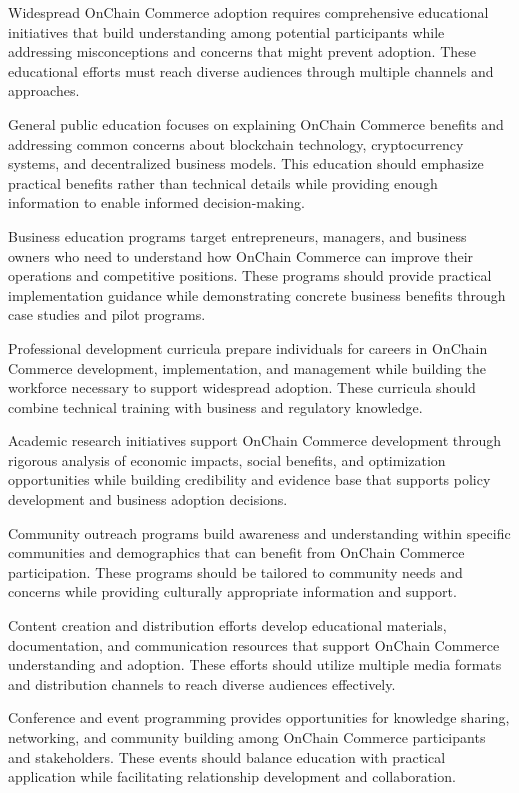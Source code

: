 \documentclass[
  Letterpaper,
]{scrbook}
\begin{document}
Widespread OnChain Commerce adoption requires comprehensive educational
initiatives that build understanding among potential participants while
addressing misconceptions and concerns that might prevent adoption.
These educational efforts must reach diverse audiences through multiple
channels and approaches.

General public education focuses on explaining OnChain Commerce benefits
and addressing common concerns about blockchain technology,
cryptocurrency systems, and decentralized business models. This
education should emphasize practical benefits rather than technical
details while providing enough information to enable informed
decision-making.

Business education programs target entrepreneurs, managers, and business
owners who need to understand how OnChain Commerce can improve their
operations and competitive positions. These programs should provide
practical implementation guidance while demonstrating concrete business
benefits through case studies and pilot programs.

Professional development curricula prepare individuals for careers in
OnChain Commerce development, implementation, and management while
building the workforce necessary to support widespread adoption. These
curricula should combine technical training with business and regulatory
knowledge.

Academic research initiatives support OnChain Commerce development
through rigorous analysis of economic impacts, social benefits, and
optimization opportunities while building credibility and evidence base
that supports policy development and business adoption decisions.

Community outreach programs build awareness and understanding within
specific communities and demographics that can benefit from OnChain
Commerce participation. These programs should be tailored to community
needs and concerns while providing culturally appropriate information
and support.

Content creation and distribution efforts develop educational materials,
documentation, and communication resources that support OnChain Commerce
understanding and adoption. These efforts should utilize multiple media
formats and distribution channels to reach diverse audiences
effectively.

Conference and event programming provides opportunities for knowledge
sharing, networking, and community building among OnChain Commerce
participants and stakeholders. These events should balance education
with practical application while facilitating relationship development
and collaboration.
\end{document}

